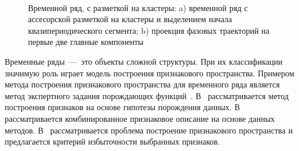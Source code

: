 \documentclass[12pt, twoside]{article}
\numberwithin{equation}{section}
\begin{document}
\begin{figure}[h!t]\center
{}
\\
\caption{Временной ряд, с разметкой на кластеры: a) временной ряд с ассесорской разметкой на кластеры и выделением начала квазипериодического сегмента; b) проекция фазовых траекторий на первые две главные компоненты }
\end{figure}

Временные ряды~---~это объекты сложной структуры. 
При их классификации значимую роль играет модель построения признакового пространства.
Примером метода построения признакового пространства для временного ряда является метод экспертного задания порождающих функций~\cite{kwapisz2010}. 
В~\cite{lukashin2003} рассматривается метод построения признаков на основе гипотезы порождения данных. 
В~\cite{Ivkin2015} рассматривается комбинированное признаковое описание на основе данных методов. 
В~\cite{Katrutsa2015} рассматривается проблема построение признакового пространства и предлагается критерий избыточности выбранных признаков.
\end{document}
